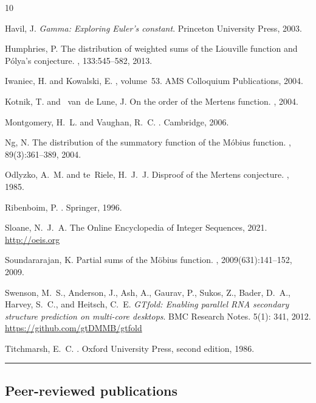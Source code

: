 \documentclass[10pt,reqno,letterpaper]{article}
\theoremstyle{plain}
\numberwithin{theorem}{section}
\theoremstyle{definition}
\newcounter{completeBibitemIncrementCtr}
\renewenvironment{thebibliography}[1]{
     \renewcommand{\refname}{} 
     
     \begin{oldthebibliography}{#1}
     \setlength{\itemsep}{0em}
     \setlength{\parskip}{0em}
     \setlength{\topsep}{0pt}
     \setlength{\partopsep}{0pt}
     \setcounter{enumiv}{\value{completeBibitemIncrementCtr}}
     \footnotesize 
}
{
     \setcounter{completeBibitemIncrementCtr}{\value{enumiv}}
     \end{oldthebibliography}
}
\begin{document}
\begin{thebibliography}{10}
Havil, J.  \emph{Gamma: Exploring Euler's constant}. Princeton University Press, 2003. 

Humphries, P.
\newblock The distribution of weighted sums of the {L}iouville function and
  {P}\'{o}lya's conjecture.
, 133:545--582, 2013.

Iwaniec, H. and Kowalski, E.
, volume~53.
\newblock AMS Colloquium Publications, 2004.

Kotnik, T. and ~van~de Lune, J.
\newblock On the order of the {M}ertens function.
, 2004.

Montgomery, H.~L. and Vaughan, R.~C.
.
\newblock Cambridge, 2006.

Ng, N.
\newblock The distribution of the summatory function of the {M}{\'{o}}bius
  function.
, 89(3):361--389, 2004.

Odlyzko, A.~M. and te~Riele, H.~J.~J. 
\newblock Disproof of the {M}ertens conjecture.
, 1985.

Ribenboim, P.
.
\newblock Springer, 1996.

Sloane, N.~J.~A.
\newblock The {O}nline {E}ncyclopedia of {I}nteger {S}equences, 2021.
\newblock \url{http://oeis.org}

Soundararajan, K.
\newblock Partial sums of the {M}{\"{o}}bius function.
, 2009(631):141--152, 2009.

Swenson, M.~S., Anderson, J., Ash, A., Gaurav, P., Sukos, Z., Bader, D.~A., 
Harvey, S.~C., and Heitsch, C.~E. 
\emph{GTfold: Enabling parallel RNA secondary structure prediction on multi-core desktops}. 
BMC Research Notes. 5(1): 341, 2012. 
\url{https://github.com/gtDMMB/gtfold} 

Titchmarsh, E.~C.
.
\newblock Oxford University Press, second edition, 1986.

\end{thebibliography}


\bigskip\hrule\bigskip
\subsection{Peer-reviewed publications} 
\label{page_BibliographyB_subSection_MDSPubs} 
\end{document}
